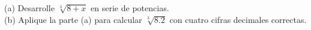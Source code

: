 \item (a) Desarrolle $\sqrt[3]{8+x}$ en serie de potencias. \\
    (b) Aplique la parte (a) para calcular $\sqrt[3]{8.2}$ con cuatro cifras decimales correctas.
